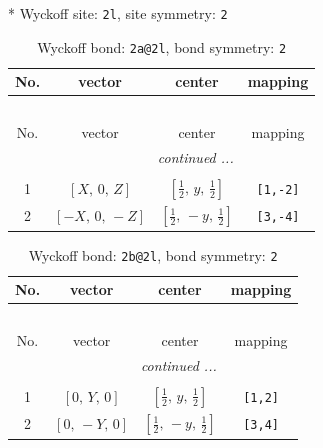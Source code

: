 \documentclass[fleqn,8pt]{jsarticle}
\begin{document}
* Wyckoff site: {\tt 2l}, site symmetry: {\tt 2}
\renewcommand{\arraystretch}{1.2}
\begin{longtable}{cccc}
\caption{Wyckoff bond: {\tt 2a@2l}, bond symmetry: {\tt 2}}
 \\
 \hline \hline
No. & vector & center & mapping \\ \hline \endfirsthead

\multicolumn{3}{l}{\tablename\ \thetable{}} \\
 \hline \hline
No. & vector & center & mapping \\ \hline \endhead

 \hline \hline
\multicolumn{3}{r}{\footnotesize\it continued ...} \\ \endfoot

 \hline \hline
\multicolumn{3}{r}{} \\ \endlastfoot

1 & $\left[ X,\, 0,\, Z \right]$ & $\left[ \frac{1}{2},\, y,\, \frac{1}{2} \right]$ & {\tt [1,-2]} \\ \hline
2 & $\left[ - X,\, 0,\, - Z \right]$ & $\left[ \frac{1}{2},\, - y,\, \frac{1}{2} \right]$ & {\tt [3,-4]} \\
\end{longtable}
\renewcommand{\arraystretch}{1.2}
\begin{longtable}{cccc}
\caption{Wyckoff bond: {\tt 2b@2l}, bond symmetry: {\tt 2}}
 \\
 \hline \hline
No. & vector & center & mapping \\ \hline \endfirsthead

\multicolumn{3}{l}{\tablename\ \thetable{}} \\
 \hline \hline
No. & vector & center & mapping \\ \hline \endhead

 \hline \hline
\multicolumn{3}{r}{\footnotesize\it continued ...} \\ \endfoot

 \hline \hline
\multicolumn{3}{r}{} \\ \endlastfoot

1 & $\left[ 0,\, Y,\, 0 \right]$ & $\left[ \frac{1}{2},\, y,\, \frac{1}{2} \right]$ & {\tt [1,2]} \\ \hline
2 & $\left[ 0,\, - Y,\, 0 \right]$ & $\left[ \frac{1}{2},\, - y,\, \frac{1}{2} \right]$ & {\tt [3,4]} \\
\end{longtable}
\renewcommand{\arraystretch}{1.2}
\end{document}
